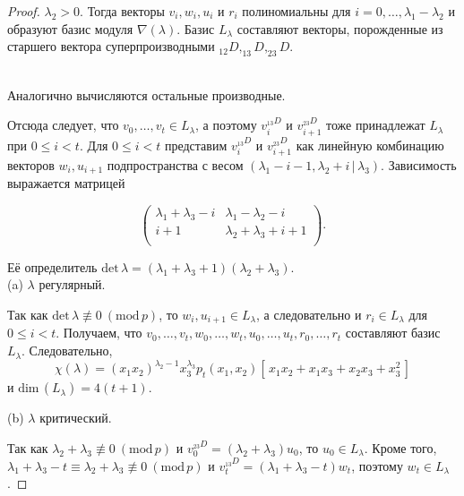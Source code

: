 \begin{proof}

$\lambda_2 > 0$. Тогда векторы $v_i, w_i, u_i \mbox{ и } r_i$ полиномиальны для $i = 0, \ldots, \lambda_1 - \lambda_2$ и образуют базис модуля $\nabla (\lambda)$.
Базис $ L_{\lambda} $ составляют векторы, порожденные из старшего вектора суперпроизводными $ _{12}D, _{13}D, _{23}D $.


\\

Аналогично вычисляются остальные производные.



Отсюда следует, что $ v_0, \ldots, v_t \in L_{\lambda} $, а поэтому $ v_i^{_{13}D} $ и $ v_{i + 1}^{_{23}D} $ 
тоже принадлежат $ L_{\lambda} $ при $ 0 \leq i < t $. Для $ 0 \leq i < t $ представим $ v_i^{_{13}D} $ и $ v_{i + 1}^{_{23}D} $ 
как линейную комбинацию векторов $ w_i, u_{i + 1} $ подпространства с весом $ (\lambda_1 - i - 1, \lambda_2 + i \,|\, \lambda_3) $. 
Зависимость выражается матрицей 

$$
\begin{pmatrix}
\lambda_1 + \lambda_3 - i & \lambda_1 - \lambda_2 - i \\
i + 1 & \lambda_2 + \lambda_3 + i + 1 \\
\end{pmatrix}
.$$

Её определитель $ \mbox{det}\, \lambda = (\lambda_1 + \lambda_3 + 1) (\lambda_2 + \lambda_3) $.
\\

(a) $\lambda$ регулярный.

Так как $ \mbox{det}\, \lambda \not\equiv 0 ~(\mbox{mod}\,p) $, то $ w_i, u_{i + 1} \in L_{\lambda} $, 
а следовательно и $ r_i \in L_{\lambda} $ для $ 0 \leq i < t $.
Получаем, что $ v_0, \ldots, v_t, w_0, \ldots, w_t, u_0, \ldots, u_t, r_0, \ldots, r_t $ составляют базис $ L_{\lambda} $. Следовательно,
$$ \chi(\lambda) = (x_1 x_2)^{\lambda_2 - 1} x_3^{\lambda_3} p_t (x_1, x_2) [\,x_1 x_2 + x_1 x_3 + x_2 x_3 + x_3^2\,] $$
и $ \mbox{dim}\,(L_{\lambda}) = 4 (t + 1). $

(b) $\lambda$ критический.

Так как $ \lambda_2 + \lambda_3 \not\equiv 0 ~(\mbox{mod}\,p) $ и $ v_0^{_{23}D} = (\lambda_2 + \lambda_3) u_0 $, то $ u_0 \in L_{\lambda}. $ 
Кроме того, $ \lambda_1 + \lambda_3 - t \equiv \lambda_2 + \lambda_3 \not\equiv 0 ~(\mbox{mod}\,p) $ и $ v_t^{_{13}D} = 
(\lambda_1 + \lambda_3 - t) w_t $, поэтому $ w_t \in L_{\lambda} $.


\end{proof}
